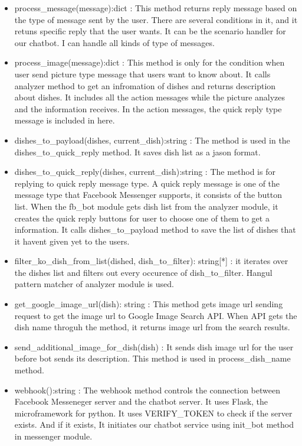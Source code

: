 \begin{itemize}
\item process\_message(message):dict : This method returns reply message based on the type of message sent by the user. There are several conditions in it, and it retuns specific reply that the user wants. It can be the scenario handler for our chatbot. I can handle all kinds of type of messages. \newline
\item process\_image(message):dict : This method is only for the condition when user send picture type message that users want to know about. It calls analyzer method to get an infromation of dishes and returns description about dishes. It includes all the action messages while the picture analyzes and the information receives. In the action messages, the quick reply type message is included in here. \newline
\item dishes\_to\_payload(dishes, current\_dish):string : The method is used in the dishes\_to\_quick\_reply method. It saves dish list as a jason format. \newline
\item dishes\_to\_quick\_reply(dishes, current\_dish):string : The method is for replying to quick reply message type. A quick reply message is one of the message type that Facebook Messenger supports, it consists of the button list. When the fb\_bot module gets dish list from the analyzer module, it creates the quick reply buttons for user to choose one of them to get a information. It calls dishes\_to\_payload method to save the list of dishes that it havent given yet to the users. \newline
\item filter\_ko\_dish\_from\_list(dished, dish\_to\_filter): string[*] : it iterates over the dishes list and filters out every occurence of dish\_to\_filter. Hangul pattern matcher of analyzer module is used. \newline 
\item get\_google\_image\_url(dish): string : This method gets image url sending request to get the image url to Google Image Search API. When API gets the dish name throguh the method, it returns image url from the search results.\newline
\item send\_additional\_image\_for\_dish(dish) : It sends dish image url for the user before bot sends its description. This method is used in process\_dish\_name method. \newline 
\item webhook():string : The webhook method controls the connection between Facebook Messeneger server and the chatbot server. It uses Flask, the microframework for python. It uses VERIFY\_TOKEN to check if the server exists. And if it exists, It initiates our chatbot service using init\_bot method in messenger module.
\end{itemize} 

